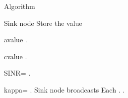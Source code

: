 \documentclass{beamer}
\newcommand{\subitem}{\par\qquad}
\begin{document}
\begin{frame}[fragile]
 \begin{algorithm}[H]
    \caption{Algorithm }\label{alg:alg1}
    \begin{algorithmic}[1]
        \STATE Sink node  
        \STATE Store the value 
        \subitem a\textunderscore value .
        \subitem c\textunderscore value .
        \subitem SINR\textunderscore = .
        \subitem kappa\textunderscore = .
        \STATE Sink node broadcasts 
        \STATE Each .
        \STATE .
    \end{algorithmic}
 \end{algorithm}
\end{frame}
\end{document}
